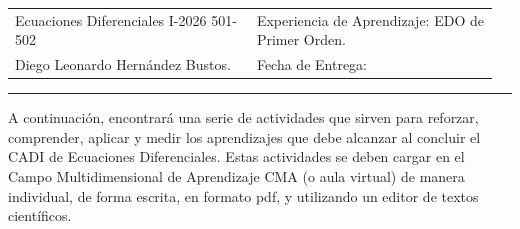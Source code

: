 \documentclass[12pt, a4paper]{article}
\begin{document}
\begin{center}
\begin{tabular}{@{}p{0.48\linewidth}p{0.48\linewidth}@{}}
    Ecuaciones Diferenciales I-2026 501-502 &
    Experiencia de Aprendizaje: EDO de Primer Orden. \\
    Diego Leonardo Hernández Bustos. &
    Fecha de Entrega: \underline{\hspace{3cm}} \\
\end{tabular}
\end{center}
\vspace{0.3cm}
\hrule
\vspace{0.5cm}

{\small A continuación, encontrará una serie de actividades que sirven para reforzar,
comprender, aplicar y medir los aprendizajes que debe alcanzar al concluir el CADI de
Ecuaciones Diferenciales. Estas actividades se deben cargar en el Campo Multidimensional
de Aprendizaje CMA (o aula virtual) de manera individual, de forma escrita, en formato
pdf, y utilizando un editor de textos científicos.}

\vspace{0.6cm}
\tableofcontents
\newpage







\end{document}
